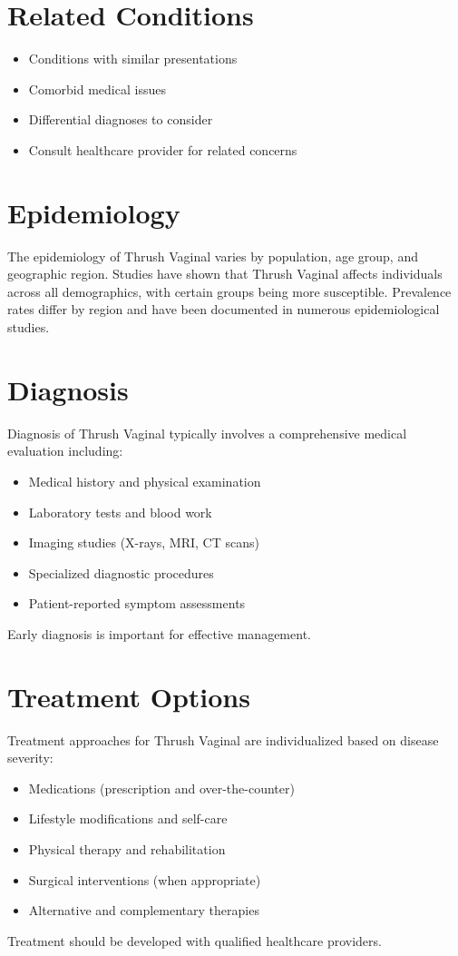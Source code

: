\section*{Related Conditions}
\begin{itemize}
  \item Conditions with similar presentations
  \item Comorbid medical issues
  \item Differential diagnoses to consider
  \item Consult healthcare provider for related concerns
\end{itemize}

\section*{Epidemiology}
The epidemiology of Thrush Vaginal varies by population, age group, and geographic region. Studies have shown that Thrush Vaginal affects individuals across all demographics, with certain groups being more susceptible. Prevalence rates differ by region and have been documented in numerous epidemiological studies.

\section*{Diagnosis}
Diagnosis of Thrush Vaginal typically involves a comprehensive medical evaluation including:
\begin{itemize}
  \item Medical history and physical examination
  \item Laboratory tests and blood work
  \item Imaging studies (X-rays, MRI, CT scans)
  \item Specialized diagnostic procedures
  \item Patient-reported symptom assessments
\end{itemize}
Early diagnosis is important for effective management.

\section*{Treatment Options}
Treatment approaches for Thrush Vaginal are individualized based on disease severity:
\begin{itemize}
  \item Medications (prescription and over-the-counter)
  \item Lifestyle modifications and self-care
  \item Physical therapy and rehabilitation
  \item Surgical interventions (when appropriate)
  \item Alternative and complementary therapies
\end{itemize}
Treatment should be developed with qualified healthcare providers.

